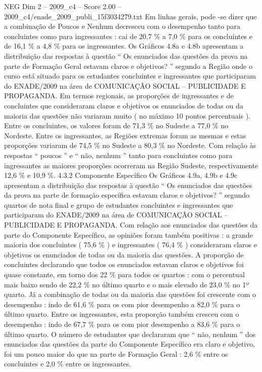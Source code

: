 \begin{textsample}{NEG Dim 2 – 2009\_c4 – Score 2.00 – 2009\_c4/enade\_2009\_publi\_15f3034279.txt}
Em linhas gerais, pode -se dizer que a combinação de Poucos e Nenhum decresceu com o desempenho tanto para concluintes como para ingressantes : cai de 20,7 \% a 7,0 \% para os concluintes e de 16,1 \% a 4,8 \% para os ingressantes.
Os Gráficos 4.8a e 4.8b apresentam a distribuição das respostas à questão “ Os enunciados das questões da prova na parte de Formação Geral estavam claros e objetivos? ” segundo a Região onde o curso está situado para os estudantes concluintes e ingressantes que participaram do ENADE/2009 na área de COMUNICAÇÃO SOCIAL – PUBLICIDADE E PROPAGANDA.
Em termos regionais, as proporções de ingressantes e de concluintes que consideraram claros e objetivos os enunciados de todas ou da maioria das questões não variaram muito ( no máximo 10 pontos percentuais ).
Entre os concluintes, os valores foram de 71,3 \% no Sudeste a 77,0 \% no Nordeste.
Entre os ingressantes, as Regiões extremas foram as mesmas e estas proporções variaram de 74,5 \% no Sudeste a 80,3 \% no Nordeste.
Com relação às respostas “ poucos ” e “ não, nenhum ” tanto para concluintes como para ingressantes as maiores proporções ocorreram na Região Sudeste, respectivamente 12,6 \% e 10,9 \%. 4.3.2 Componente Específico Os Gráficos 4.9a, 4.9b e 4.9c apresentam a distribuição das respostas à questão “ Os enunciados das questões da prova na parte de formação específica estavam claros e objetivos? ” segundo quartos de nota final e grupo de estudantes concluintes e ingressantes que participaram do ENADE/2009 na área de COMUNICAÇÃO SOCIAL – PUBLICIDADE E PROPAGANDA.
Com relação aos enunciados das questões da parte do Componente Específico, as opiniões foram também positivas : a grande maioria dos concluintes ( 75,6 \% ) e ingressantes ( 76,4 \% ) consideraram claros e objetivos os enunciados de todas ou da maioria das questões.
A proporção de concluintes declarando que todos os enunciados estavam claros e objetivos foi quase constante, em torno dos 22 \% para todos os quartos : com o percentual mais baixo sendo de 22,2 \% no último quarto e o mais elevado de 23,0 \% no 1º quarto.
Já a combinação de todas ou da maioria das questões foi crescente com o desempenho : indo de 61,6 \% para os com pior desempenho a 82,0 \% para o último quarto.
Entre os ingressantes, esta proporção também cresceu com o desempenho : indo de 67,7 \% para os com pior desempenho a 83,6 \% para o último quarto.
O número de estudantes que declararam que “ não, nenhum ” dos enunciados das questões da parte do Componente Específico era claro e objetivo, foi um pouco maior do que na parte de Formação Geral : 2,6 \% entre os concluintes e 2,0 \% entre os ingressantes.

\end{textsample}
